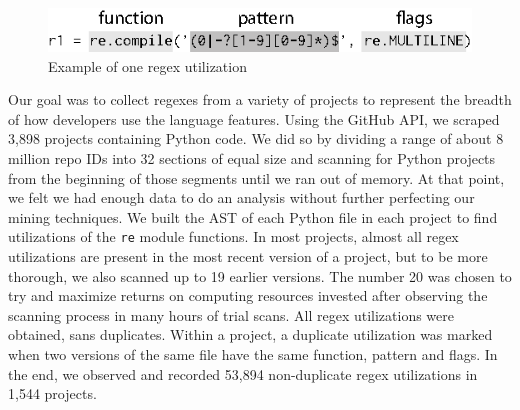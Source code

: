 \begin{figure}[tb]
\centering
\includegraphics[width=\columnwidth]{illustrations/exampleUsage.eps}
\vspace{-12pt}
\caption{Example of one regex utilization}
\vspace{-6pt}
\label{fig:exampleUsage}
\end{figure}

Our goal was to collect regexes from a variety of projects to represent the breadth of how developers use the language features.
Using the GitHub API, we scraped 3,898 projects containing Python code.
We did so  by dividing a range of about 8 million repo IDs
into 32 sections of equal size and scanning  for Python projects from the beginning of those
segments until we ran out of memory. At that point, we felt we had enough data
to do an analysis without further perfecting our mining techniques. We built
the AST of each Python file in each project to find utilizations of the {\tt re} module
functions. In most projects, almost all regex utilizations are present in the
most recent version of a project, but to be more thorough, we also scanned up
to 19 earlier versions. The number 20 was chosen to try and maximize returns on
computing resources invested after observing the scanning process in many hours
of trial scans.
All regex utilizations were obtained, sans duplicates. Within a project, a duplicate utilization was marked when two versions of the same file have the same function, pattern and flags.  In the end, we observed and recorded 53,894 non-duplicate regex utilizations in 1,544 projects.

